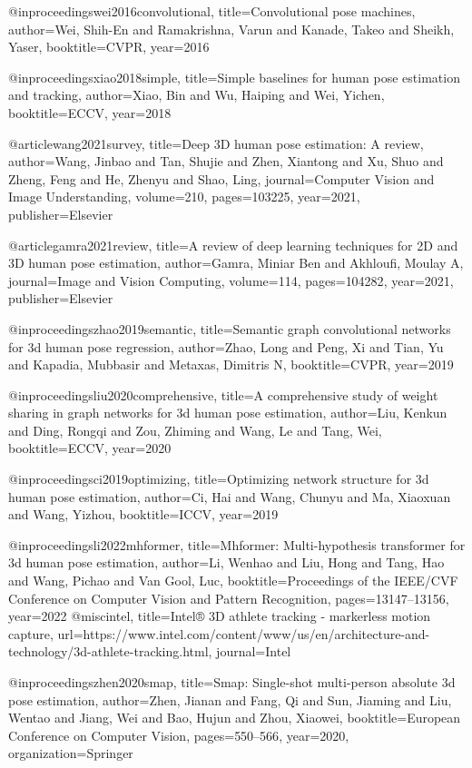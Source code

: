 @inproceedings{wei2016convolutional,
  title={Convolutional pose machines},
  author={Wei, Shih-En and Ramakrishna, Varun and Kanade, Takeo and Sheikh, Yaser},
  booktitle=CVPR,
  year={2016}
}

@inproceedings{xiao2018simple,
  title={Simple baselines for human pose estimation and tracking},
  author={Xiao, Bin and Wu, Haiping and Wei, Yichen},
  booktitle=ECCV,
  year={2018}
}

@article{wang2021survey,
  title={Deep {3D} human pose estimation: A review},
  author={Wang, Jinbao and Tan, Shujie and Zhen, Xiantong and Xu, Shuo and Zheng, Feng and He, Zhenyu and Shao, Ling},
  journal={Computer Vision and Image Understanding},
  volume={210},
  pages={103225},
  year={2021},
  publisher={Elsevier}
}

@article{gamra2021review,
  title={A review of deep learning techniques for {2D} and {3D} human pose estimation},
  author={Gamra, Miniar Ben and Akhloufi, Moulay A},
  journal={Image and Vision Computing},
  volume={114},
  pages={104282},
  year={2021},
  publisher={Elsevier}
}

@inproceedings{zhao2019semantic,
  title={Semantic graph convolutional networks for 3d human pose regression},
  author={Zhao, Long and Peng, Xi and Tian, Yu and Kapadia, Mubbasir and Metaxas, Dimitris N},
  booktitle=CVPR,
  year={2019}
}

@inproceedings{liu2020comprehensive,
  title={A comprehensive study of weight sharing in graph networks for 3d human pose estimation},
  author={Liu, Kenkun and Ding, Rongqi and Zou, Zhiming and Wang, Le and Tang, Wei},
  booktitle=ECCV,
  year={2020}
}

@inproceedings{ci2019optimizing,
  title={Optimizing network structure for 3d human pose estimation},
  author={Ci, Hai and Wang, Chunyu and Ma, Xiaoxuan and Wang, Yizhou},
  booktitle=ICCV,
  year={2019}
}

@inproceedings{li2022mhformer,
  title={Mhformer: Multi-hypothesis transformer for 3d human pose estimation},
  author={Li, Wenhao and Liu, Hong and Tang, Hao and Wang, Pichao and Van Gool, Luc},
  booktitle={Proceedings of the IEEE/CVF Conference on Computer Vision and Pattern Recognition},
  pages={13147--13156},
  year={2022}
}
 @misc{intel, title={Intel® 3D athlete tracking - markerless motion capture}, url={https://www.intel.com/content/www/us/en/architecture-and-technology/3d-athlete-tracking.html}, journal={Intel}} 

 @inproceedings{zhen2020smap,
  title={Smap: Single-shot multi-person absolute 3d pose estimation},
  author={Zhen, Jianan and Fang, Qi and Sun, Jiaming and Liu, Wentao and Jiang, Wei and Bao, Hujun and Zhou, Xiaowei},
  booktitle={European Conference on Computer Vision},
  pages={550--566},
  year={2020},
  organization={Springer}
}